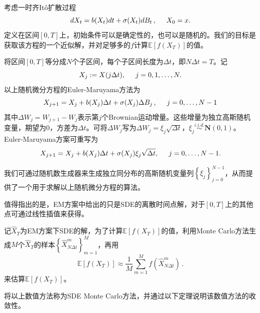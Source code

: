 \documentclass[oneside]{sysuthesis}
\begin{document}
考虑一时齐It\^o扩散过程
\[
dX_t=b(X_t)dt+\sigma(X_t)dB_t\,,\hspace{0.5cm}X_0=x.
\]
定义在区间$[0,T]$上，初始条件可以是确定性的，也可以是随机的。我们的目标是获取该方程的一个近似解，并对足够多的$f$计算$\mathbb{E}[f(X_T)]$的值。

将区间$[0,T]$等分成$N$个子区间，每个子区间长度为$\Delta t$，即$N\Delta t=T$。记
\[
X_j:=X(j\Delta t),\hspace{0.5cm}j=0,1,\dots,N.
\]
以上随机微分方程的Euler-Maruyama方法为
\[
X_{j+1}=X_j+b(X_j)\Delta t+\sigma(X_j)\Delta B_j\,,\hspace{0.5cm}j=0,\dots ,N-1
\]
其中$\Delta W_j=W_{j+1}-W_j$表示第$j$个Brownian运动增量。这些增量为独立高斯随机变量，期望为$0$，方差为$\Delta t$。可将$\Delta W_j$写为$\Delta W_j=\xi_j\sqrt{\Delta t}$，$\xi_j\overset{i.i.d.}{\sim}\mathbf{N}(0,1)$。Euler-Maruyama方案可重写为
\[
X_{j+1}=X_j+b(X_j)\Delta t+\sigma(X_j)\xi_j\sqrt{\Delta t},\hspace{0.5cm}j=0,\dots ,N-1.
\]

我们可通过随机数生成器来生成独立同分布的高斯随机变量列$\left\{\xi_j\right\}_{j=0}^{N-1}$，从而提供了一个用于求解以上随机微分方程的算法。

值得指出的是，EM方案中给出的只是SDE的离散时间点解，对于$[0,T]$上的其他点可通过线性插值来获得。

记$\hat{X}_T$为EM方案下SDE的解，为了计算$\mathbb{E}[f(X_T)]$的值，利用Monte Carlo方法生成$M$个$\hat{X}_T$的样本$\left\{\widehat{X}_{N\Delta t}^m\right\}_{m=1}^M$，再用
\[
\mathbb{E}[f(X_T)]\approx\frac{1}{M}\sum_{m=1}^{M}f(\widehat{X}_{N\Delta t}^m)\,.
\]
来估算$\mathbb{E}[f(X_T)]$。

将以上数值方法称为SDE Monte Carlo方法，并通过以下定理说明该数值方法的收敛性。
\end{document}
